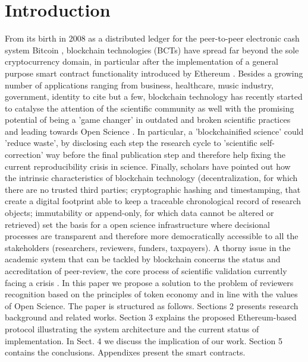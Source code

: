 \documentclass[runningheads]{llncs}
\begin{document}
\section{Introduction}
From its birth in 2008 as a distributed ledger for the peer-to-peer electronic cash system Bitcoin \cite{Bitcoin}, blockchain technologies (BCTs) have spread far beyond the sole cryptocurrency domain, in particular after the implementation of a general purpose smart contract functionality introduced by Ethereum \cite{Ethereum-Wood}.
Besides a growing number of applications ranging from business, healthcare, music industry, government, identity to cite but a few, blockchain technology has recently started to catalyse the attention of the scientific community as well \cite{Bitcoin-Nature-focus,vanRossum2017-DigSci} with the promising potential of being a 'game changer' in outdated and broken scientific practices and leading towards Open Science \cite{AES}. In particular, a 'blockchainified science'\cite{BlockchainforScience} could 'reduce waste'\cite{ReducingWaste-Lancet}, by disclosing each step the research cycle to 'scientific self-correction' way before the final publication step and therefore help fixing the current reproducibility crisis in science. Finally, scholars have pointed out how the intrinsic characteristics of blockchain technology (decentralization, for which there are no trusted third parties; cryptographic hashing and timestamping, that create a digital footprint able to keep a traceable chronological record of research objects; immutability or append-only, for which data cannot be altered or retrieved) set the basis for a open science infrastructure \cite{ReviewBlockchain2019} where decisional processes are transparent and therefore more democratically accessible to all the stakeholders (researchers, reviewers, funders, taxpayers).
A thorny issue in the academic system that can be tackled by blockchain concerns the status and accreditation of peer-review, the core process of scientific validation currently facing a crisis \cite{Gropp-PeerRevStress}. In this paper we propose a solution to the problem of reviewers recognition based on the principles of token economy and in line with the values of Open Science.
The paper is structured as follows. Sections 2 presents research background and related works. Section 3 explains the proposed Ethereum-based protocol illustrating the system architecture and the current status of implementation. In Sect. 4 we discuss the implication of our work. Section 5 contains the conclusions. Appendixes present the smart contracts. 
\end{document}
